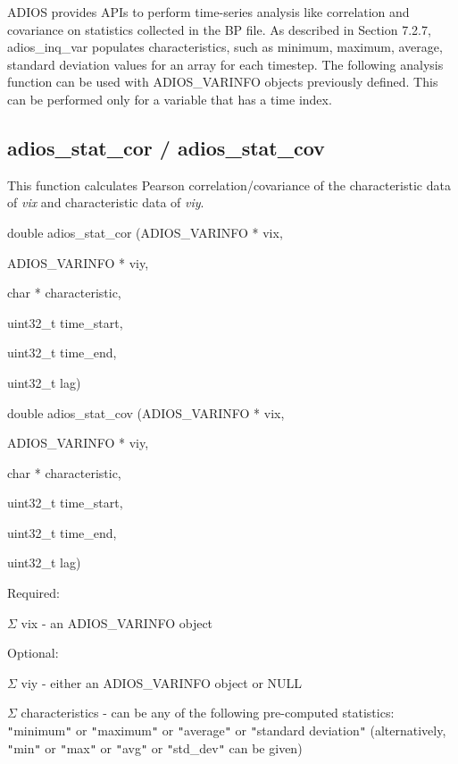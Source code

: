 ADIOS provides APIs to perform time-series analysis like correlation and covariance 
on statistics collected in the BP file. As described in Section 7.2.7, adios\_inq\_var 
populates characteristics, such as minimum, maximum, average, standard deviation 
values for an array for each timestep. The following analysis function can be used 
with ADIOS\_VARINFO objects previously defined. This can be performed only for 
a variable that has a time index.\label{HToc182553412}

\subsection{adios\_stat\_cor / adios\_stat\_cov}

This function calculates Pearson correlation/covariance of the characteristic data 
of \textit{vix} and characteristic data of \textit{viy}.

double adios\_stat\_cor (ADIOS\_VARINFO * vix, 

ADIOS\_VARINFO * viy, 

\parindent=64pt
char          * characteristic, 

\parindent=46pt
uint32\_t        time\_start, 

\parindent=28pt
uint32\_t        time\_end, 

\parindent=7pt
uint32\_t        lag)

\parindent=0pt
double adios\_stat\_cov (ADIOS\_VARINFO * vix, 

ADIOS\_VARINFO * viy, 

\parindent=64pt
char          * characteristic, 

\parindent=46pt
uint32\_t        time\_start, 

\parindent=28pt
uint32\_t        time\_end, 

\parindent=7pt
uint32\_t        lag)

\parindent=0pt
Required:

\ensuremath{\Sigma} vix - an ADIOS\_VARINFO object

Optional:

\ensuremath{\Sigma} viy - either an ADIOS\_VARINFO object or NULL 

\ensuremath{\Sigma} characteristics - can be any of the following pre-computed 
statistics: \texttt{"}minimum\texttt{"} or \texttt{"}maximum\texttt{"} or \texttt{"}average\texttt{"} 
or \texttt{"}standard deviation\texttt{"} (alternatively, \texttt{"}min\texttt{"} 
or \texttt{"}max\texttt{"} or \texttt{"}avg\texttt{"} or \texttt{"}std\_dev\texttt{"} 
can be given)

